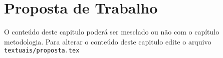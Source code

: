 \chapter{Proposta de Trabalho}
O conteúdo deste capitulo poderá ser mesclado ou não com o capítulo metodologia. Para alterar o conteúdo deste capitulo edite o arquivo \verb|textuais/proposta.tex|